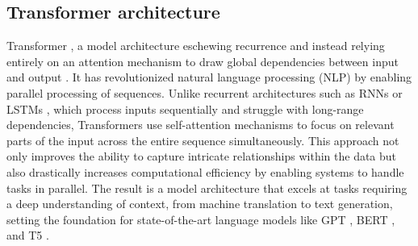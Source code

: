 

\subsection{Transformer architecture}

Transformer \cite{vaswani2017}, a model architecture eschewing recurrence and instead relying entirely on an attention mechanism to draw global dependencies between input and output \cite{vaswani2017}. It has revolutionized natural language processing (NLP) by enabling parallel processing of sequences. Unlike recurrent architectures such as RNNs \cite{rumelhart1988rnn} or LSTMs \cite{lstm}, which process inputs sequentially and struggle with long-range dependencies, Transformers use self-attention mechanisms to focus on relevant parts of the input across the entire sequence simultaneously. This approach not only improves the ability to capture intricate relationships within the data but also drastically increases computational efficiency by enabling systems to handle tasks in parallel. The result is a model architecture that excels at tasks requiring a deep understanding of context, from machine translation to text generation, setting the foundation for state-of-the-art language models like GPT \cite{radford2018GPT}, BERT \cite{devlin2019bert}, and T5 \cite{raffel2023t5}.

